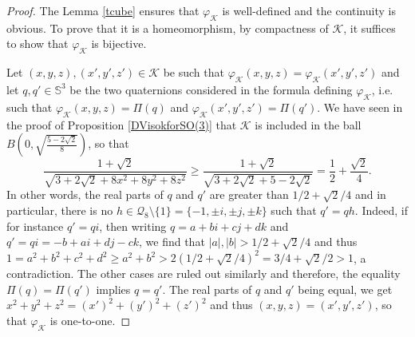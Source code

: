 \documentclass[11pt,twoside]{amsart}
\theoremstyle{plain}
\newcommand{\Sph}{\mathbb{S}}
\begin{document}
\begin{proof}
The Lemma \ref{tcube} ensures that $\varphi_{\mathcal{K}}$ is well-defined and the continuity is obvious. To prove that it is a homeomorphism, by compactness of $\mathcal{K}$, it suffices to show that $\varphi_{\mathcal{K}}$ is bijective.

Let $(x,y,z),(x',y',z')\in\mathcal{K}$ be such that $\varphi_{\mathcal{K}}(x,y,z)=\varphi_{\mathcal{K}}(x',y',z')$ and let $q,q'\in\Sph^3$ be the two quaternions considered in the formula defining $\varphi_{\mathcal{K}}$, i.e. such that $\varphi_{\mathcal{K}}(x,y,z)=\Pi(q)$ and $\varphi_{\mathcal{K}}(x',y',z')=\Pi(q')$. We have seen in the proof of Proposition \ref{DVisokforSO(3)} that $\mathcal{K}$ is included in the ball $B\left(0,\sqrt{\tfrac{5-2\sqrt{2}}{8}}\right)$, so that
\[\frac{1+\sqrt{2}}{\sqrt{3+2\sqrt{2}+8x^2+8y^2+8z^2}}\ge\frac{1+\sqrt{2}}{\sqrt{3+2\sqrt{2}+5-2\sqrt{2}}}=\frac12+\frac{\sqrt{2}}{4}.\]
In other words, the real parts of $q$ and $q'$ are greater than $1/2+\sqrt{2}/4$ and in particular, there is no $h\in\mathcal{Q}_8\setminus\{1\}=\{-1,\pm i,\pm j,\pm k\}$ such that $q'=qh$. Indeed, if for instance $q'=qi$, then writing $q=a+bi+cj+dk$ and $q'=qi=-b+ai+dj-ck$, we find that $|a|,|b|>1/2+\sqrt{2}/4$ and thus $1=a^2+b^2+c^2+d^2\ge a^2+b^2>2(1/2+\sqrt{2}/4)^2=3/4+\sqrt{2}/2>1$, a contradiction. The other cases are ruled out similarly and therefore, the equality $\Pi(q)=\Pi(q')$ implies $q=q'$. The real parts of $q$ and $q'$ being equal, we get $x^2+y^2+z^2=(x')^2+(y')^2+(z')^2$ and thus $(x,y,z)=(x',y',z')$, so that $\varphi_{\mathcal{K}}$ is one-to-one.


\end{proof}
\end{document}

